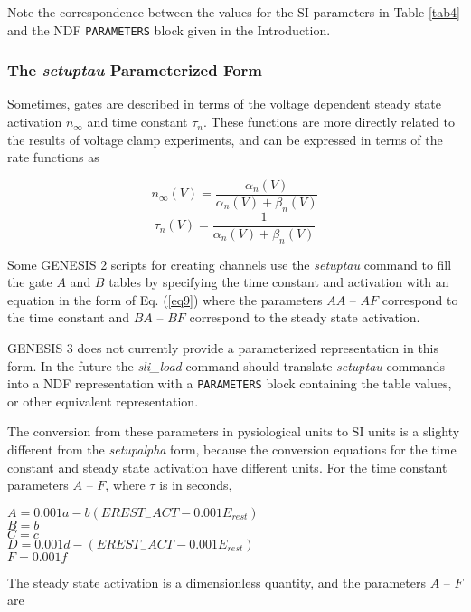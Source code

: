 \documentclass[12pt]{article}
\begin{document}
Note the correspondence between the values for the SI parameters in Table
\ref{tab4} and the NDF {\tt PARAMETERS} block given in the Introduction.

\subsubsection{The {\em setuptau} Parameterized Form}
\label{sec4-2}

Sometimes, gates are described in terms of the voltage dependent steady state
activation $n_\infty$ and time constant $\tau_n$.  These functions are more
directly related to the results of voltage clamp experiments, and can be
expressed in terms of the rate functions as

\begin{equation}
n_\infty(V) = \frac{ \alpha_n(V) }{ \alpha_n(V) + \beta_n(V) }
\label{eq11}
\end{equation}
\begin{equation}
\tau_n(V) = \frac{1}{\alpha_n(V) + \beta_n(V)}
\label{eq12}
\end{equation}


Some GENESIS 2 scripts for creating channels use the {\em setuptau} command
to fill the gate $A$ and $B$ tables by specifying the time constant and
activation with an equation in the form of Eq. (\ref{eq9}) where the
parameters $AA$ -- $AF$ correspond to the time constant and $BA$ -- $BF$
correspond to the steady state activation.

GENESIS 3 does not currently provide a parameterized representation in
this form.  In the future the {\em sli\_load} command should  translate
{\em setuptau} commands into a NDF representation with a {\tt PARAMETERS}
block containing the table values, or other equivalent representation.

The conversion from these parameters in pysiological units to SI units
is a slighty different from the {\em setupalpha} form, because the
conversion equations for the time constant and steady state activation
have different units.   For the time constant parameters $A$ -- $F$,
where $\tau$ is in seconds,

$A = 0.001 a - b (EREST_{-}ACT - 0.001 E_{rest})$ \\
$B = b$ \\
$C = c$ \\
$D = 0.001 d - (EREST_{-}ACT - 0.001 E_{rest})$ \\
$F = 0.001 f$

The steady state activation is a dimensionless quantity, and the
parameters $A$ -- $F$ are
\end{document}
